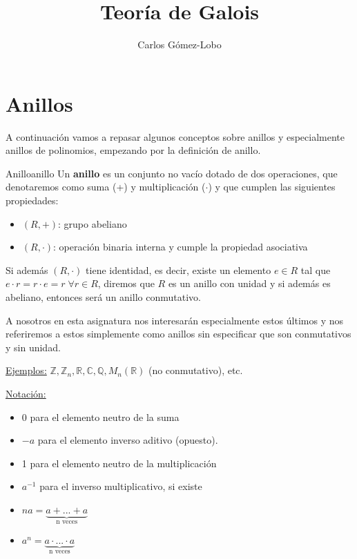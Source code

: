 \documentclass[10pt, a4paper]{article}
\newcommand{\R}{\mathbb{R}}
\newcommand{\Z}{\mathbb{Z}}
\newcommand{\C}{\mathbb{C}}
\newcommand{\Q}{\mathbb{Q}}
\begin{document}
\title{Teoría de Galois}
\author{Carlos Gómez-Lobo}
\date{}
\maketitle


\section{Anillos}

A continuación vamos a repasar algunos conceptos sobre anillos y especialmente anillos de polinomios, empezando por la definición de anillo.

\begin{definition}{Anillo}{anillo}
Un \textbf{anillo} es un conjunto no vacío dotado de dos operaciones, que denotaremos como suma (+) y multiplicación ($\cdot$) y que cumplen las siguientes propiedades:
\begin{itemize}
	\item $(R, +)$: grupo abeliano
	\item $(R, \cdot)$: operación binaria interna y cumple la propiedad asociativa
\end{itemize}
Si además $(R, \cdot)$ tiene identidad, es decir, existe un elemento $e \in R$ tal que $e \cdot r = r \cdot e = r \; \forall r \in R$, diremos que $R$ es un anillo con unidad y si además es abeliano, entonces será un anillo conmutativo.
\end{definition}

A nosotros en esta asignatura nos interesarán especialmente estos últimos y nos referiremos a estos simplemente como anillos sin especificar que son conmutativos y sin unidad.

\vspace{3mm}

\underline{Ejemplos:} $\Z, \Z_n, \R, \C, \Q, M_n(\R)$ (no conmutativo), etc.

\vspace{3mm}

\underline{Notación:} \begin{itemize}
	\item 0 para el elemento neutro de la suma
	\item $-a$ para el elemento inverso aditivo (opuesto).
	\item 1 para el elemento neutro de la multiplicación
	\item $a^{-1}$ para el inverso multiplicativo, si existe
	\item $na = \underbrace{a + ... + a}_{\text{n veces}}$
	
	\vspace{-3mm}
	
	\item $a^n = \underbrace{a \cdot ... \cdot a}_{\text{n veces}}$
\end{itemize}
\end{document}
